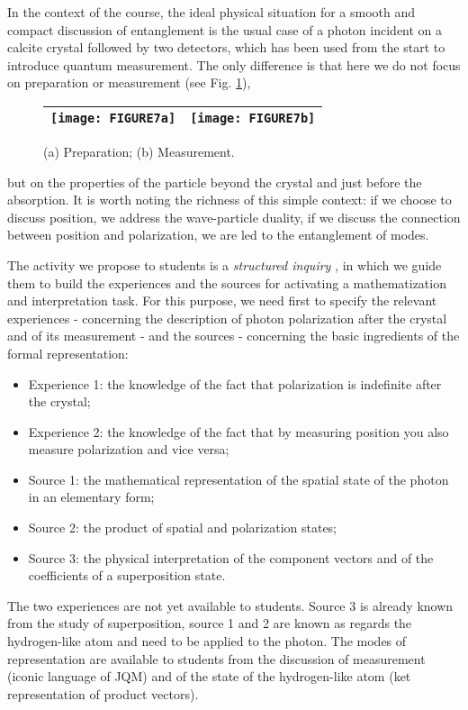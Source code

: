 \documentclass[twocolumn,secnumarabic,amssymb, nobibnotes, aps, prd, nofootinbib]{revtex4-2}
\begin{document}
In the context of the course, the ideal physical situation for a smooth and compact discussion of entanglement is the usual case of a photon incident on a calcite crystal followed by two detectors, which has been used from the start to introduce quantum measurement. The only difference is that here we do not focus on preparation or measurement (see Fig. \ref{FIG:7}),
\begin{figure} \centering
\begin{tabular}{|r|l|} \hline
    \texttt{[image: FIGURE7a]} &
    \texttt{[image: FIGURE7b]} \\ \hline
\end{tabular}
    \caption{(a) Preparation; (b) Measurement.}
    \label{FIG:7}
\end{figure}
but on the properties of the particle beyond the crystal and just before the absorption. It is worth noting the richness of this simple context: if we choose to discuss position, we address the wave-particle duality, if we discuss the connection between position and polarization, we are led to the entanglement of modes.

The activity we propose to students is a \emph{structured inquiry} \cite{Llewellyn2012}, in which we guide them to build the experiences and the sources for activating a mathematization and interpretation task. For this purpose, we need first to specify the relevant experiences - concerning the description of photon polarization after the crystal and of its measurement - and the sources - concerning the basic ingredients of the formal representation:
\begin{itemize}
\item Experience 1: the knowledge of the fact that polarization is indefinite after the crystal;
\item Experience 2: the knowledge of the fact that by measuring position you also measure polarization and vice versa;
\item Source 1: the mathematical representation of the spatial state of the photon in an elementary form;
\item Source 2: the product of spatial and polarization states;
\item Source 3: the physical interpretation of the component vectors and of the coefficients of a superposition state.
\end{itemize}
The two experiences are not yet available to students. Source 3 is already known from the study of superposition, source 1 and 2 are known as regards the hydrogen-like atom and need to be applied to the photon. The modes of representation are available to students from the discussion of measurement (iconic language of JQM) and of the state of the hydrogen-like atom (ket representation of product vectors).
\end{document}
